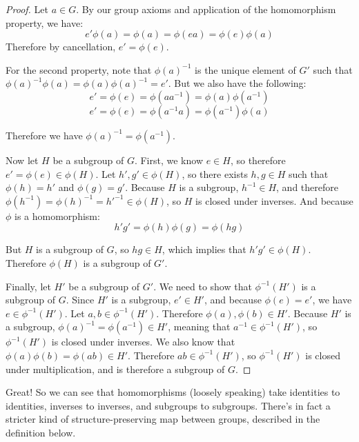 \documentclass[12pt]{article}
\newcommand{\inv}[1]{#1^{-1}}
\theoremstyle{definition}
\begin{document}
\begin{proof}
Let $a \in G$. By our group axioms and application of the homomorphism property, we have:
\begin{equation*}
    e'\phi(a) = \phi(a) = \phi(ea) = \phi(e)\phi(a)
\end{equation*}
Therefore by cancellation, $e' = \phi(e)$.

For the second property, note that $\inv{\phi(a)}$ is the unique element of $G'$ such that $\inv{\phi(a)}\phi(a) = \phi(a)\inv{\phi(a)} = e'$. But we also have the following:
\begin{equation*}
    e' = \phi(e) = \phi(a\inv{a}) = \phi(a)\phi(\inv a)
\end{equation*}
\begin{equation*}
    e' = \phi(e) = \phi(\inv a a) = \phi(\inv a)\phi(a)
\end{equation*}

Therefore we have $\inv{\phi(a)} = \phi(\inv a)$.

Now let $H$ be a subgroup of $G$. First, we know $e \in H$, so therefore $e' = \phi(e) \in \phi(H)$. Let $h', g' \in \phi(H)$, so there exists $h, g \in H$ such that $\phi(h) = h'$ and $\phi(g) = g'$. Because $H$ is a subgroup, $\inv h \in H$, and therefore $\phi(\inv h) = \inv{\phi(h)} = \inv{h'} \in \phi(H)$, so $H$ is closed under inverses. And because $\phi$ is a homomorphism:
\begin{equation*}
    h'g' = \phi(h)\phi(g) = \phi(hg)
\end{equation*}

But $H$ is a subgroup of $G$, so $hg \in H$, which implies that $h'g' \in \phi(H)$. Therefore $\phi(H)$ is a subgroup of $G'$.

Finally, let $H'$ be a subgroup of $G'$. We need to show that $\inv \phi (H')$ is a subgroup of $G$. Since $H'$ is a subgroup, $e' \in H'$, and because $\phi(e) = e'$, we have $e \in \inv \phi(H')$. Let $a, b \in \inv \phi(H')$. Therefore $\phi(a), \phi(b) \in H'$. Because $H'$ is a subgroup, $\inv{\phi(a)} = \phi(\inv a) \in H'$, meaning that $\inv a \in \inv\phi(H')$, so $\inv\phi(H')$ is closed under inverses. We also know that $\phi(a)\phi(b) = \phi(ab) \in H'$. Therefore $ab \in \inv\phi(H')$, so $\inv\phi(H')$ is closed under multiplication, and is therefore a subgroup of $G$.

\end{proof}

Great! So we can see that homomorphisms (loosely speaking) take identities to identities, inverses to inverses, and subgroups to subgroups. There's in fact a stricter kind of structure-preserving map between groups, described in the definition below.
\end{document}
